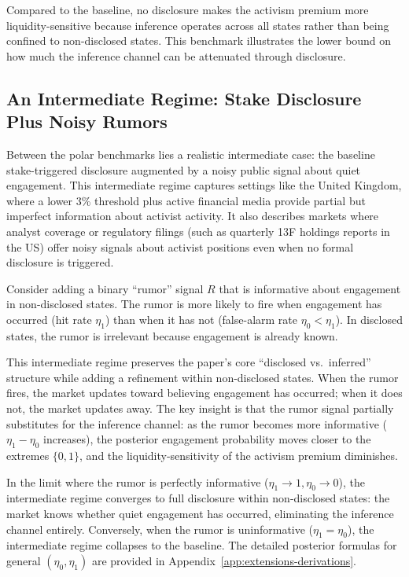 \documentclass[11pt]{article}
\newcommand{\1}{\mathbf{1}}
\begin{document}
Compared to the baseline, no disclosure makes the activism premium more liquidity-sensitive because inference operates across all states rather than being confined to non-disclosed states. This benchmark illustrates the lower bound on how much the inference channel can be attenuated through disclosure.

\subsection{An Intermediate Regime: Stake Disclosure Plus Noisy Rumors}

Between the polar benchmarks lies a realistic intermediate case: the baseline stake-triggered disclosure augmented by a noisy public signal about quiet engagement. This intermediate regime captures settings like the United Kingdom, where a lower 3\% threshold plus active financial media provide partial but imperfect information about activist activity. It also describes markets where analyst coverage or regulatory filings (such as quarterly 13F holdings reports in the US) offer noisy signals about activist positions even when no formal disclosure is triggered.

Consider adding a binary ``rumor'' signal $R$ that is informative about engagement in non-disclosed states. The rumor is more likely to fire when engagement has occurred (hit rate $\eta_1$) than when it has not (false-alarm rate $\eta_0<\eta_1$). In disclosed states, the rumor is irrelevant because engagement is already known.

This intermediate regime preserves the paper's core ``disclosed vs.\ inferred'' structure while adding a refinement within non-disclosed states. When the rumor fires, the market updates toward believing engagement has occurred; when it does not, the market updates away. The key insight is that the rumor signal partially substitutes for the inference channel: as the rumor becomes more informative ($\eta_1-\eta_0$ increases), the posterior engagement probability moves closer to the extremes $\{0,1\}$, and the liquidity-sensitivity of the activism premium diminishes.

In the limit where the rumor is perfectly informative ($\eta_1\to1,\eta_0\to0$), the intermediate regime converges to full disclosure within non-disclosed states: the market knows whether quiet engagement has occurred, eliminating the inference channel entirely. Conversely, when the rumor is uninformative ($\eta_1=\eta_0$), the intermediate regime collapses to the baseline. The detailed posterior formulas for general $(\eta_0,\eta_1)$ are provided in Appendix~\ref{app:extensions-derivations}.
\end{document}
